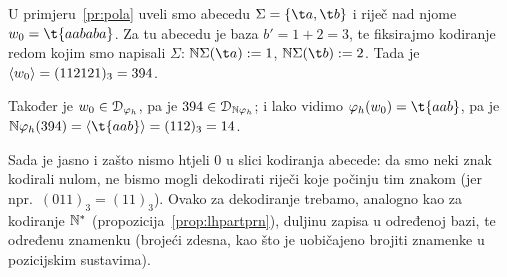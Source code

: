 \begin{primjer}
U primjeru~\ref{pr:pola} uveli smo abecedu $\Sigma=\{\t a,\t b\}$ i riječ nad njome $w_0=\t{aababa}$. Za tu abecedu je baza $b'=1+2=3$, te fiksirajmo kodiranje redom kojim smo napisali $\Sigma$: $\N\Sigma(\t a):=1$, $\N\Sigma(\t b):=2$. Tada je $\langle w_0\rangle=(112121)_3=394$.

Također je $w_0\in\mathcal D_{\varphi_h}$, pa je $394\in\mathcal D_{{\mathbb N}\varphi_h}$; i lako vidimo $\varphi_h(w_0)=\t{aab}$, pa je
$\N\varphi_h(394)=\kr{\t{aab}}=(112)_3=14$.
\end{primjer}

Sada je jasno i zašto nismo htjeli $0$ u slici kodiranja abecede: da smo neki znak kodirali nulom, ne bismo mogli dekodirati riječi koje počinju tim znakom (jer npr.\ $(011)_3=(11)_3$). Ovako za dekodiranje trebamo, analogno kao za kodiranje ${\mathbb N}^*$ (propozicija~\ref{prop:lhpartprn}), duljinu zapisa u određenoj bazi, te određenu znamenku (brojeći zdesna, kao što je uobičajeno brojiti znamenke u pozicijskim sustavima).

